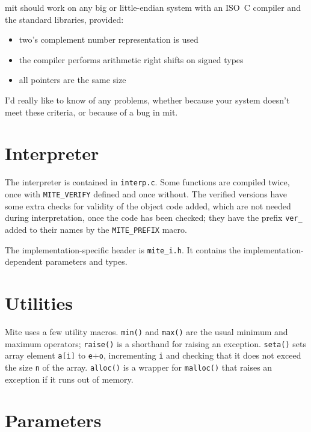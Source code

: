 \documentclass[english]{scrartcl}
\begin{document}
mit should work on any big or little-endian system with an ISO~C
compiler and the standard libraries, provided:

\begin{itemize}
\item two's complement number representation is used
\item the compiler performs arithmetic right shifts on signed types
\item all pointers are the same size
\end{itemize}

\noindent I'd really like to know of any problems, whether because
your system doesn't meet these criteria, or because of a bug in mit.



\section{Interpreter}

The interpreter is contained in \verb|interp.c|. Some functions are
compiled twice, once with \verb|MITE_VERIFY| defined and once without.
The verified versions have some extra checks for validity of the
object code added, which are not needed during interpretation, once
the code has been checked; they have the prefix \verb|ver_| added to
their names by the \verb|MITE_PREFIX| macro.

The implementation-specific header is \verb|mite_i.h|. It contains the
implementation-dependent parameters and types.



\section{Utilities}

Mite uses a few utility macros. \verb|min()| and \verb|max()| are the
usual minimum and maximum operators; \verb|raise()| is a shorthand for
raising an exception. \verb|seta()| sets array element \verb|a[i]| to
\verb|e|$+$\verb|o|, incrementing \verb|i| and checking that it does
not exceed the size \verb|n| of the array. \verb|alloc()| is a wrapper
for \verb|malloc()| that raises an exception if it runs out of memory.



\section{Parameters}
\end{document}

